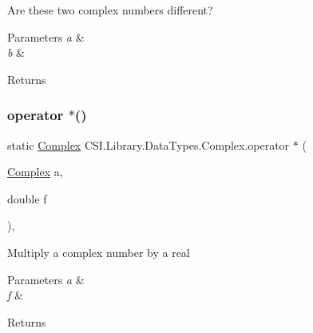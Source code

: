 Are these two complex numbers different? 


\begin{DoxyParams}{Parameters}
{\em a} & \\
\hline
{\em b} & \\
\hline
\end{DoxyParams}
\begin{DoxyReturn}{Returns}

\end{DoxyReturn}
\mbox{\label{struct_c_s_i_1_1_library_1_1_data_types_1_1_complex_a90f5ebb798a031197d2f5b93bc528570}} 
\subsubsection{\texorpdfstring{operator $\ast$()}{operator *()}\hspace{0.1cm}{\footnotesize\ttfamily [1/3]}}
{\footnotesize\ttfamily static \mbox{\hyperlink{struct_c_s_i_1_1_library_1_1_data_types_1_1_complex}{Complex}} C\+S\+I.\+Library.\+Data\+Types.\+Complex.\+operator $\ast$ (\begin{DoxyParamCaption}\item[{\mbox{\hyperlink{struct_c_s_i_1_1_library_1_1_data_types_1_1_complex}{Complex}}}]{a,  }\item[{double}]{f }\end{DoxyParamCaption})\hspace{0.3cm}{\ttfamily [inline]}, {\ttfamily [static]}}



Multiply a complex number by a real 


\begin{DoxyParams}{Parameters}
{\em a} & \\
\hline
{\em f} & \\
\hline
\end{DoxyParams}
\begin{DoxyReturn}{Returns}

\end{DoxyReturn}
\mbox{\label{struct_c_s_i_1_1_library_1_1_data_types_1_1_complex_a58f4af6281aab31aa595cb59ba8656eb}} 
